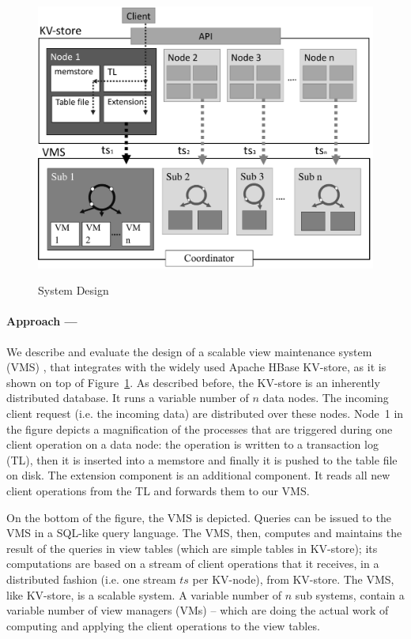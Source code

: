 	

    \begin{figure}[h]
    	\centering
    	\includegraphics[width=0.7\linewidth]{figures/VMS_system_overview}
    	\label{fig:System_Design)}
    	\caption{System Design}
    \end{figure}
    
    \paragraph{Approach ---}
 	We describe and evaluate the design of a scalable view maintenance 
	system (VMS) \cite{Adler_2016_a}, that integrates with the widely used Apache HBase 
	KV-store, as it is shown on top of Figure~\ref{fig:System_Design)}. 
	As described before, the KV-store is an inherently
	distributed database. It runs a variable number of $n$ data nodes. The 
	incoming client request (i.e. the incoming data) are distributed over these 
	nodes. Node~1 in the figure depicts a magnification of the processes
	that are triggered during one client operation on a data node: the
	operation is written to a transaction log (TL), then it is inserted
	into a memstore and finally it is pushed to the table file on disk.
	The extension component is an additional component. It reads all new 
	client operations from the TL and forwards them to our VMS.   
	
 	On the bottom of the figure, the VMS is depicted. Queries can be issued 
	to the VMS in a SQL-like query language. The VMS, then, computes and 
	maintains the result of the queries in view tables (which are simple tables 
	in KV-store); its computations are based on a stream of client
	operations that it receives, in a distributed fashion (i.e. one stream 
	$ts$ per KV-node), from KV-store. The VMS, like KV-store, is a scalable 
	system. A variable number of $n$ sub systems, contain a variable number 
	of view managers (VMs) -- which are doing the actual work of computing and 
	applying the client operations to the view tables. 
		
